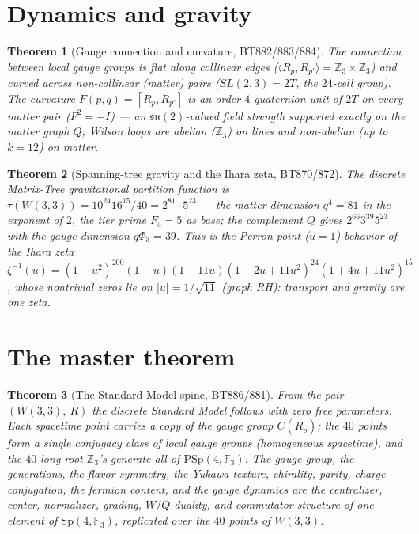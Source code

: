 \documentclass[11pt]{article}
\newtheorem{theorem}{Theorem}
\newcommand{\W}{W(3,3)}
\newcommand{\GF}[1]{\mathbb{F}_{#1}}
\newcommand{\Sp}{\mathrm{Sp}}
\newcommand{\PSp}{\mathrm{PSp}}
\newcommand{\Z}{\mathbb{Z}}
\begin{document}
\section{Dynamics and gravity}
\begin{theorem}[Gauge connection and curvature, BT882/883/884]
The connection between local gauge groups is flat along collinear edges
($\langle R_p,R_{p'}\rangle=\Z_3\times\Z_3$) and curved across
non-collinear (matter) pairs ($SL(2,3)=2T$, the $24$-cell group). The
curvature $F(p,q)=[R_p,R_{p'}]$ is an order-$4$ quaternion unit of $2T$
on every matter pair ($F^2=-I$) --- an $\mathfrak{su}(2)$-valued field
strength supported exactly on the matter graph $Q$; Wilson loops are
abelian ($\Z_3$) on lines and non-abelian (up to $k=12$) on matter.
\end{theorem}

\begin{theorem}[Spanning-tree gravity and the Ihara zeta, BT870/872]
The discrete Matrix-Tree gravitational partition function is
$\tau(\W)=10^{24}16^{15}/40=2^{81}\cdot5^{23}$ --- the matter dimension
$q^4=81$ in the exponent of $2$, the tier prime $F_5=5$ as base; the
complement $Q$ gives $2^{66}3^{39}5^{23}$ with the gauge dimension
$q\Phi_3=39$. This is the Perron-point ($u=1$) behavior of the Ihara
zeta $\zeta^{-1}(u)=(1-u^2)^{200}(1-u)(1-11u)(1-2u+11u^2)^{24}
(1+4u+11u^2)^{15}$, whose nontrivial zeros lie on $|u|=1/\sqrt{11}$
(graph RH): transport and gravity are one zeta.
\end{theorem}

\section{The master theorem}
\begin{theorem}[The Standard-Model spine, BT886/881]
From the pair $(\W,\ R)$ the discrete Standard Model follows with zero
free parameters. Each spacetime point carries a copy of the gauge group
$C(R_p)$; the $40$ points form a single conjugacy class of local gauge
groups (homogeneous spacetime), and the $40$ long-root $\Z_3$'s generate
all of $\PSp(4,\GF3)$. The gauge group, the generations, the flavor
symmetry, the Yukawa texture, chirality, parity, charge-conjugation,
the fermion content, and the gauge dynamics are the centralizer, center,
normalizer, grading, $W/Q$ duality, and commutator structure of one
element of $\Sp(4,\GF3)$, replicated over the $40$ points of $\W$.
\end{theorem}
\end{document}
